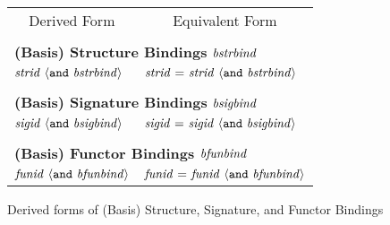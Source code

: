 \begin{figure}[h]
\begin{center}
\begin{tabular}{|l|l|}
\multicolumn{1}{c}{Derived Form} &
\multicolumn{1}{c}{Equivalent Form} \\
\multicolumn{2}{c}{} \\
\multicolumn{2}{l}{\textbf{(Basis) Structure Bindings} $\mit{bstrbind}$} \\
\hline
$\mit{strid} ~\langle\mtt{and}~ \mit{bstrbind}\rangle$ &
$\mit{strid} ~\mtt{=}~ \mit{strid} ~\langle\mtt{and}~ \mit{bstrbind}\rangle$ \\
\hline
\multicolumn{2}{c}{} \\
\multicolumn{2}{l}{\textbf{(Basis) Signature Bindings} $\mit{bsigbind}$} \\
\hline
$\mit{sigid} ~\langle\mtt{and}~ \mit{bsigbind}\rangle$ &
$\mit{sigid} ~\mtt{=}~ \mit{sigid} ~\langle\mtt{and}~ \mit{bsigbind}\rangle$ \\
\hline
\multicolumn{2}{c}{} \\
\multicolumn{2}{l}{\textbf{(Basis) Functor Bindings} $\mit{bfunbind}$} \\
\hline
$\mit{funid} ~\langle\mtt{and}~ \mit{bfunbind}\rangle$ &
$\mit{funid} ~\mtt{=}~ \mit{funid} ~\langle\mtt{and}~ \mit{bfunbind}\rangle$ \\
\hline
\end{tabular}
\end{center}
\caption{Derived forms of (Basis) Structure, Signature, and Functor Bindings}\label{fig:mlb:DF:bindings}
\end{figure}

